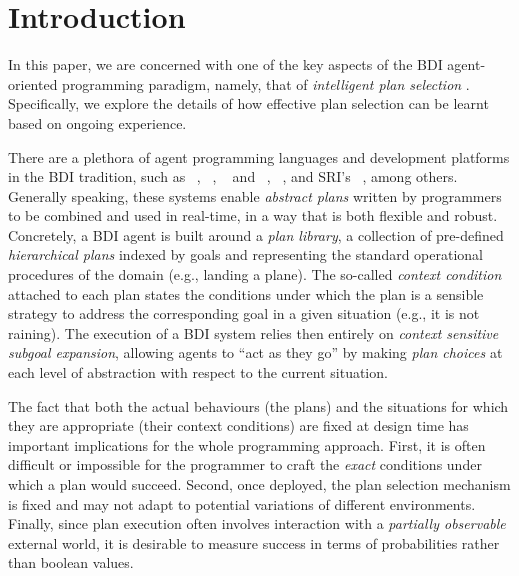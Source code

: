 \section{Introduction}\label{sec:intro}

In this paper, we are concerned with one of the key aspects of the BDI
agent-oriented programming paradigm, namely, that of \emph{intelligent plan
selection} \cite{Pollack92-IRMA,Georgeff89-PRS}.
Specifically, we explore the details of how effective plan selection can be
learnt based on ongoing experience.


There are a plethora of agent programming languages and development platforms in
the BDI tradition, such as  \PRS\ \cite{Georgeff89-PRS}, \JACK~\cite{Busetta99jack},
\TAPL~\cite{Hindriks99:Agent} and \DAPL~\cite{Dastani:JAAMAS08-2APL},
\JASON~\cite{jasonbook}, and SRI's \SPARK~\cite{MorelyM:AAMAS04-SPARK}, among
others. %
Generally speaking, these systems enable \emph{abstract plans} written by
programmers to be combined and used in real-time, in a way that is both flexible
and robust. Concretely, a BDI agent is built around a
\textit{plan library}, a collection of pre-defined \textit{hierarchical plans}
indexed by goals and representing the standard operational procedures of the
domain (e.g., landing a plane).
The so-called \emph{context condition} attached to each plan states the
conditions under which the plan is a sensible strategy to address the
corresponding goal in a given situation (e.g., it is not raining). The execution
of a BDI system relies then entirely on \textit{context sensitive subgoal
expansion}, allowing agents to ``act as they go'' by making \emph{plan
choices} at each level of abstraction with respect to the current situation.



The fact that both the actual behaviours (the plans) and the situations for which
they are appropriate (their context conditions) are fixed at design time has
important implications for the whole programming approach.
First, it is often difficult or impossible for the programmer to craft the
\emph{exact} conditions under which a plan would succeed. Second, once deployed,
the plan selection mechanism is fixed and may not adapt to potential variations of different environments.
Finally, since plan execution often involves interaction with a \emph{partially
observable} external world, it is desirable to measure success in terms of probabilities rather than boolean values.


